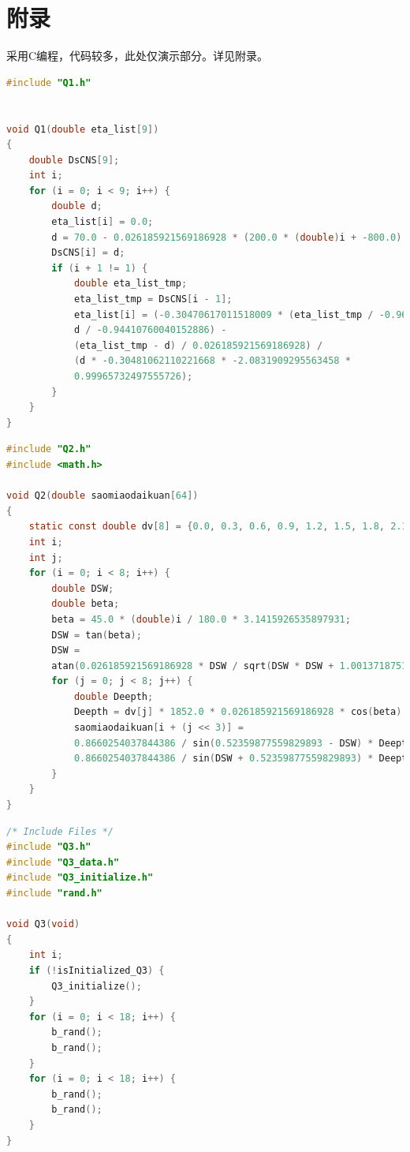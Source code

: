 \documentclass[12pt,a4paper]{article}
\begin{document}
\section*{附录}
采用C编程，代码较多，此处仅演示部分。详见附录。
\begin{lstlisting}[caption={Q1.c},language=C]
#include "Q1.h"


void Q1(double eta_list[9])
{
	double DsCNS[9];
	int i;
	for (i = 0; i < 9; i++) {
		double d;
		eta_list[i] = 0.0;
		d = 70.0 - 0.026185921569186928 * (200.0 * (double)i + -800.0);
		DsCNS[i] = d;
		if (i + 1 != 1) {
			double eta_list_tmp;
			eta_list_tmp = DsCNS[i - 1];
			eta_list[i] = (-0.30470617011518009 * (eta_list_tmp / -0.960065624146096 +
			d / -0.94410760040152886) -
			(eta_list_tmp - d) / 0.026185921569186928) /
			(d * -0.30481062110221668 * -2.0831909295563458 *
			0.99965732497555726);
		}
	}
}
\end{lstlisting}
\begin{lstlisting}[caption={Q2.c},language=C]
#include "Q2.h"
#include <math.h>

void Q2(double saomiaodaikuan[64])
{
	static const double dv[8] = {0.0, 0.3, 0.6, 0.9, 1.2, 1.5, 1.8, 2.1};
	int i;
	int j;
	for (i = 0; i < 8; i++) {
		double DSW;
		double beta;
		beta = 45.0 * (double)i / 180.0 * 3.1415926535897931;
		DSW = tan(beta);
		DSW =
		atan(0.026185921569186928 * DSW / sqrt(DSW * DSW + 1.001371875164758));
		for (j = 0; j < 8; j++) {
			double Deepth;
			Deepth = dv[j] * 1852.0 * 0.026185921569186928 * cos(beta) + 120.0;
			saomiaodaikuan[i + (j << 3)] =
			0.8660254037844386 / sin(0.52359877559829893 - DSW) * Deepth +
			0.8660254037844386 / sin(DSW + 0.52359877559829893) * Deepth;
		}
	}
}
\end{lstlisting}
\begin{lstlisting}[caption={Q3.c},language=C]
/* Include Files */
#include "Q3.h"
#include "Q3_data.h"
#include "Q3_initialize.h"
#include "rand.h"

void Q3(void)
{
	int i;
	if (!isInitialized_Q3) {
		Q3_initialize();
	}
	for (i = 0; i < 18; i++) {
		b_rand();
		b_rand();
	}
	for (i = 0; i < 18; i++) {
		b_rand();
		b_rand();
	}
}	
\end{lstlisting}
\end{document}
